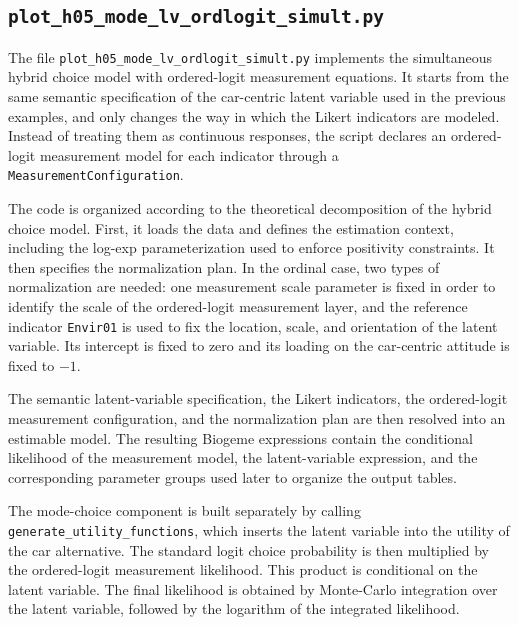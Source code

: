 \documentclass[12pt,a4paper]{article}
\begin{document}
\subsection{\lstinline$plot_h05_mode_lv_ordlogit_simult.py$}
\label{sec:plot_h05_mode_lv_ordlogit_simult.py}


The file \lstinline$plot_h05_mode_lv_ordlogit_simult.py$ implements
the simultaneous hybrid choice model with ordered-logit measurement
equations. It starts from the same semantic specification of the
car-centric latent variable used in the previous examples, and only
changes the way in which the Likert indicators are modeled. Instead
of treating them as continuous responses, the script declares an
ordered-logit measurement model for each indicator through a
\lstinline$MeasurementConfiguration$.

The code is organized according to the theoretical decomposition of
the hybrid choice model. First, it loads the data and defines the
estimation context, including the log-exp parameterization used to
enforce positivity constraints. It then specifies the normalization
plan. In the ordinal case, two types of normalization are needed: one
measurement scale parameter is fixed in order to identify the scale of
the ordered-logit measurement layer, and the reference indicator
\lstinline$Envir01$ is used to fix the location, scale, and orientation
of the latent variable. Its intercept is fixed to zero and its loading
on the car-centric attitude is fixed to \(-1\).

The semantic latent-variable specification, the Likert indicators, the
ordered-logit measurement configuration, and the normalization plan
are then resolved into an estimable model. The resulting Biogeme
expressions contain the conditional likelihood of the measurement
model, the latent-variable expression, and the corresponding parameter
groups used later to organize the output tables.

The mode-choice component is built separately by calling
\lstinline$generate_utility_functions$, which inserts the latent
variable into the utility of the car alternative. The standard logit
choice probability is then multiplied by the ordered-logit
measurement likelihood. This product is conditional on the latent
variable. The final likelihood is obtained by Monte-Carlo integration
over the latent variable, followed by the logarithm of the integrated
likelihood.
\end{document}
